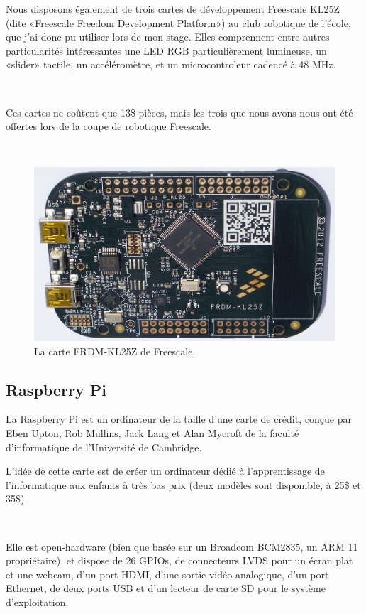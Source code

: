 \documentclass{article}
\begin{document}
Nous disposons également de trois cartes de développement Freescale KL25Z (dite «Freescale Freedom Development Platform») au club robotique de l’école, que j’ai donc pu utiliser lors de mon stage. Elles comprennent entre autres particularités intéressantes une LED RGB particulièrement lumineuse, un «slider» tactile, un accéléromètre, et un microcontroleur cadencé à 48 MHz.

~

Ces cartes ne coûtent que 13\$ pièces, mais les trois que nous avons nous ont été offertes lors de la coupe de robotique Freescale.

~

\begin{figure}[h!]
    \centering\includegraphics[width=\linewidth*2/3]{img/freescale.jpg}
    \caption{La carte FRDM-KL25Z de Freescale.}
\end{figure}

\clearpage

\subsection{Raspberry Pi}
\label{rpi}

La Raspberry Pi est un ordinateur de la taille d’une carte de crédit, conçue par Eben Upton, Rob Mullins, Jack Lang et Alan Mycroft de la faculté d’informatique de l’Université de Cambridge.

L’idée de cette carte est de créer un ordinateur dédié à l’apprentissage de l’informatique aux enfants à très bas prix (deux modèles sont disponible, à 25\$ et 35\$).

~

Elle est open-hardware (bien que basée sur un Broadcom BCM2835, un ARM 11 propriétaire), et dispose de 26 GPIOs, de connecteurs LVDS pour un écran plat et une webcam, d’un port HDMI, d’une sortie vidéo analogique, d’un port Ethernet, de deux ports USB et d’un lecteur de carte SD pour le système d’exploitation.
\end{document}
